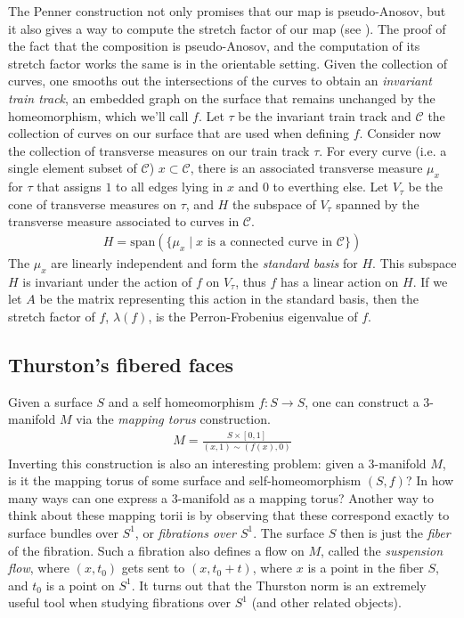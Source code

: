 The Penner construction not only promises that our map is pseudo-Anosov, but it also gives a way to
compute the stretch factor of our map (see \cite{penner1988construction}).  The proof of the fact
that the composition is pseudo-Anosov, and the computation of its stretch factor works the same is
in the orientable setting.  Given the collection of curves, one smooths out the intersections of the
curves to obtain an \textit{invariant train track}, an embedded graph on the surface that remains
unchanged by the homeomorphism, which we'll call $f$. Let $\tau$ be the invariant train track and
$\mathcal{C}$ the collection of curves on our surface that are used when defining $f$. Consider now
the collection of transverse measures on our train track $\tau$. For every curve (i.e. a single
element subset of $\mathcal{C}$) $x \subset \mathcal{C}$, there is an associated transverse measure
$\mu_x$ for $\tau$ that assigns $1$ to all edges lying in $x$ and 0 to everthing else. Let $V_\tau$
be the cone of transverse measures on $\tau$, and $H$ the subspace of $V_\tau$ spanned by the
transverse measure associated to curves in $\mathcal{C}$.
\begin{align*}
  H = \mathrm{span}(\{\mu_x \mid x \text{ is a connected curve in } \mathcal{C}\})
\end{align*}
The $\mu_x$ are linearly independent and form the \textit{standard basis} for $H$. This subspace $H$
is invariant under the action of $f$ on $V_\tau$, thus $f$ has a linear action on $H$. If we let $A$
be the matrix representing this action in the standard basis, then the stretch factor of $f$,
$\lambda(f)$, is the Perron-Frobenius eigenvalue of $f$.

\subsection{Thurston's fibered faces}
\label{sec:thurst-fiber-face}

Given a surface $S$ and a self homeomorphism $f: S \to S$, one can construct a $3$-manifold $M$ via
the \emph{mapping torus} construction.
\begin{align*}
  M = \frac{S \times [0,1]}{(x,1) \sim (f(x), 0)}
\end{align*}
Inverting this construction is also an interesting problem: given a $3$-manifold $M$, is it the
mapping torus of some surface and self-homeomorphism $(S,f)$? In how many ways can one express a
$3$-manifold as a mapping torus? Another way to think about these mapping torii is by observing that
these correspond exactly to surface bundles over $S^1$, or \emph{fibrations over $S^1$}. The surface
$S$ then is just the \emph{fiber} of the fibration. Such a fibration also defines a {flow} on $M$,
called the \emph{suspension flow}, where $(x, t_0)$ gets sent to $(x, t_0 + t)$, where $x$ is a point
in the fiber $S$, and $t_0$ is a point on $S^1$. It turns out that the Thurston norm is an extremely
useful tool when studying fibrations over $S^1$ (and other related objects).

